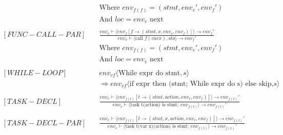 \begin{align*}
    \\ & \text{Where }env_{f(f)} = (stmt, env_v\prime, env_f\prime) \\
                          & \text{And }loc = env_v \text{ next}
    \\
    \\
    [FUNC-CALL-PAR] \quad &
    \frac
    {env_v \vdash \langle env_f[f \to (stmt, x, env_v, env_f)]\rangle\to env_f \prime}
    {env_v \vdash \langle \text{call }f(var x), sto\rangle \to env_f\prime}
    \\ & \text{Where }env_{f(f)} = (stmt, env_v\prime, env_f\prime) \\
                          & \text{And }loc = env_v \text{ next}
    \\
    \\
    [WHILE-LOOP] \quad    &
    env_{vf} \langle \text{While expr do stmt}, s \rangle                                                       \\ &  \Rightarrow env_{vf} \langle \text{if expr then (stmt; While expr do s) else skip,} s \rangle
    \\
    \\
    [TASK-DECL] \quad     &
    \frac
    {env_v\vdash\langle env_{f(t)}[t \to (stmt, action, env_v, env_f)]\rangle \to env_{f(t)}\prime}
    {env_v \vdash \langle \text{task t(action) is stmt; } env_{f(t)} \rangle \to env_{f(t)}\prime}
    \\
    \\
    [TASK-DECL-PAR] \quad &
    \frac
    {env_v\vdash\langle env_{f(t)}[t \to (stmt, x, action, env_v, env_f)]\rangle \to env_{f(t)}\prime}
    {env_v \vdash \langle \text{task t(var x)(action) is stmt; } env_{f(t)} \rangle \to env_{f(t)}\prime}
    \\
    \\
\end{align*}


